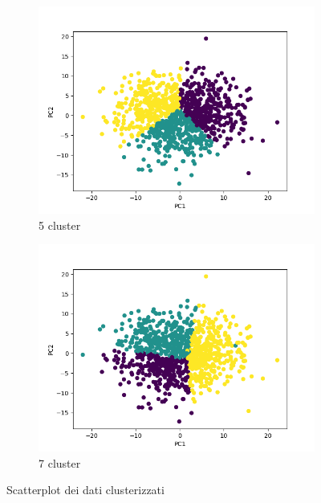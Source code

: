 \documentclass{article}
\begin{document}
    \begin{figure}[h]
     \centering
     \begin{subfigure}[b]{0.49\linewidth}
         \centering
         \includegraphics[width=\linewidth]{../results/plots/scatter_carino_kmeans}
         \caption{5 cluster}
     \end{subfigure}
     \begin{subfigure}[b]{0.49\linewidth}
         \centering
         \includegraphics[width=\linewidth]{../results/plots/scatter_carino}
         \caption{7 cluster}
     \end{subfigure}
     \caption{Scatterplot dei dati clusterizzati}
     \label{fig:2}
    \end{figure}
\end{document}

